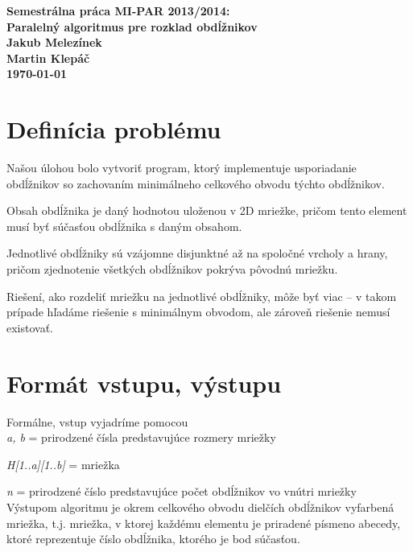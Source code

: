 \documentclass[slovak]{article}
\begin{document}
\begin{center}
\bf Semestrálna práca MI-PAR 2013/2014:\\[5mm]
    Paralelný algoritmus pre rozklad obdĺžnikov\\[5mm]
       Jakub Melezínek\\
       Martin Klepáč\\[2mm]
\today
\end{center}

\section{Definícia problému}

Našou úlohou bolo vytvoriť program, ktorý implementuje usporiadanie obdĺžnikov so zachovaním minimálneho celkového obvodu týchto obdĺžnikov.

Obsah obdĺžnika je daný hodnotou uloženou v 2D mriežke, pričom tento element musí byť súčasťou obdĺžnika s daným obsahom.

Jednotlivé obdĺžniky sú vzájomne disjunktné až na spoločné vrcholy a hrany, pričom zjednotenie všetkých obdĺžnikov pokrýva pôvodnú mriežku.

Riešení, ako rozdeliť mriežku na jednotlivé obdĺžniky, môže byť viac -- v takom prípade hľadáme riešenie s minimálnym obvodom, ale zároveň riešenie nemusí existovať.


\section{Formát vstupu, výstupu}

Formálne, vstup vyjadríme pomocou \\ 

\emph{a, b} = prirodzené čísla predstavujúce rozmery mriežky

\emph{H[1..a][1..b]} = mriežka

\emph{n} = prirodzené číslo predstavujúce počet obdĺžnikov vo vnútri mriežky \\

Výstupom algoritmu je okrem celkového obvodu dielčích obdĺžnikov vyfarbená mriežka, t.j. mriežka, v ktorej každému elementu je priradené písmeno abecedy, ktoré reprezentuje číslo obdĺžnika, ktorého je bod súčasťou.
\end{document}
